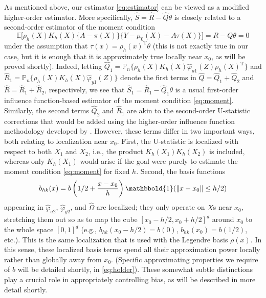 \documentclass[11pt,twoside]{article}
\def\T{{ \mathrm{\scriptscriptstyle T} }}
\newcommand{\Pn}{\mathbb{P}_n}
\newcommand{\E}{\mathbb{E}}
\newcommand{\one}{\mathbbold{1}}
\theoremstyle{definition}
\theoremstyle{remark}
\begin{document}
As mentioned above, our estimator \eqref{eq:estimator} can be viewed as a modified higher-order estimator. More specifically, $\widehat{S}=\widehat{R}-\widehat{Q} \theta$ is closely related to a second-order estimator of the moment condition
\begin{equation} 
\E\Big[ \rho_h(X) K_h(X) \Big\{A-\pi(X) \Big\} \Big\{ Y - \mu_0(X) - A \tau(X)  \Big\} \Big]  = R-Q\theta = 0 \label{eq:moment}
\end{equation}
under the assumption that $\tau(x) = \rho_h(x)^\T \theta$ (this is not exactly true in our case, but  it is enough that it is approximately true locally near $x_0$, as will be proved shortly). Indeed, letting $\widehat{Q}_1=\Pn \{ \rho_h(X) K_h(X)  \widehat\varphi_{a1}(Z) \rho_h(X)^\T \}$ and $\widehat{R}_1=\Pn \{ \rho_h(X) K_h(X)  \widehat\varphi_{y1}(Z) \}$ denote the first terms in $\widehat{Q}=\widehat{Q}_1+\widehat{Q}_2$ and  $\widehat{R}=\widehat{R}_1+\widehat{R}_2$, respectively, we see that $\widehat{S}_1 = \widehat{R}_1 - \widehat{Q}_1 \theta$ is a usual first-order influence function-based estimator of the moment condition \eqref{eq:moment}. Similarly, the second terms $\widehat{Q}_2$ and $\widehat{R}_1$ are akin to the second-order U-statistic corrections that would be added using the higher-order influence function methodology developed by \citet{robins2008higher, robins2009quadratic, robins2017minimax}. However,  these terms differ in two important ways, both relating to localization near $x_0$. First,  the U-statistic is localized with respect to both $X_1$ and $X_2$, i.e., the product $K_h(X_1)K_h(X_2)$ is included, whereas only $K_h(X_1)$ would arise if the goal were purely to estimate the moment condition \eqref{eq:moment} for fixed $h$. Second, the basis functions 
$$ b_{hk}(x) = b\left(1/2 + \frac{x-x_0}{h} \right) \one(\|x-x_0 \| \leq h/2) $$ 
appearing in $\widehat\varphi_{a2}$, $\widehat\varphi_{y2}$, and $\widehat\Omega$ are localized; they only operate on $X$s near $x_0$, stretching them out so as to map the cube $[x_0-h/2,x_0+h/2]^d$ around $x_0$ to the whole space $[0,1]^d$ (e.g., $b_{hk}(x_0-h/2)=b(0)$, $b_{hk}(x_0)=b(1/2)$, etc.). This is the same localization that is used with the Legendre basis $\rho(x)$. In this sense, these localized basis terms spend all their approximation power locally rather than globally away from $x_0$. (Specific approximating properties we require of $b$ will be detailed shortly, in \eqref{eq:holder}). These somewhat subtle distinctions play a crucial role in appropriately controlling bias, as will be described in more detail shortly. \\
\end{document}
